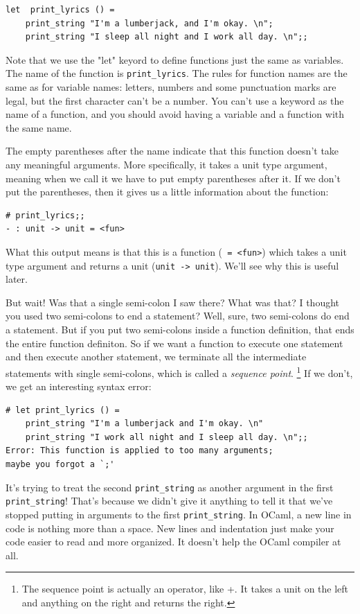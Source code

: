 \documentclass[10pt]{book}
\begin{document}
\beforeverb
\begin{verbatim}
let  print_lyrics () = 
    print_string "I'm a lumberjack, and I'm okay. \n";
    print_string "I sleep all night and I work all day. \n";;
\end{verbatim}
\afterverb
%
Note that we use the "let" keyord to define functions just the same as
variables. The name of the function is \verb"print_lyrics".  The
rules for function names are the same as for variable names: letters,
numbers and some punctuation marks are legal, but the first character
can't be a number.  You can't use a keyword as the name of a function,
and you should avoid having a variable and a function with the same
name.


The empty parentheses after the name indicate that this function
doesn't take any meaningful arguments. More specifically, it takes a unit type
argument, meaning when we call it we have to put empty parentheses after it.
If we don't put the parentheses, then it gives us a little information about
the function:

\beforeverb
\begin{verbatim}
# print_lyrics;;
- : unit -> unit = <fun>
\end{verbatim}
\afterverb
What this output means is that this is a function (\verb" = <fun>") which takes
a unit type argument and returns a unit (\verb"unit -> unit"). We'll see why this
is useful later.

But wait! Was that a single semi-colon I saw there? What was that? I thought
you used two semi-colons to end a statement? Well, sure, two semi-colons do
end a statement. But if you put two semi-colons inside a function definition, 
that ends the entire function definiton. So if we want a function to execute
one statement and then execute another statement, we terminate all the intermediate
statements with single semi-colons, which is called a {\em sequence point}. \footnote{
The sequence point is actually an operator, like +. It takes a unit on the 
left and anything on the right and returns the right.}
If we don't, we get an interesting syntax error:

\beforeverb
\begin{verbatim}
# let print_lyrics () = 
	print_string "I'm a lumberjack and I'm okay. \n"
	print_string "I work all night and I sleep all day. \n";;
Error: This function is applied to too many arguments;
maybe you forgot a `;'
\end{verbatim}
\afterverb
It's trying to treat the second \verb"print_string" as another argument in the first \verb"print_string"!
That's because we didn't give it anything to tell it that we've stopped putting in arguments
to the first \verb"print_string". In OCaml, a new line in code is nothing more than a space.
New lines and indentation just make your code easier to read and more organized. It doesn't
help the  OCaml compiler at all.
\end{document}
